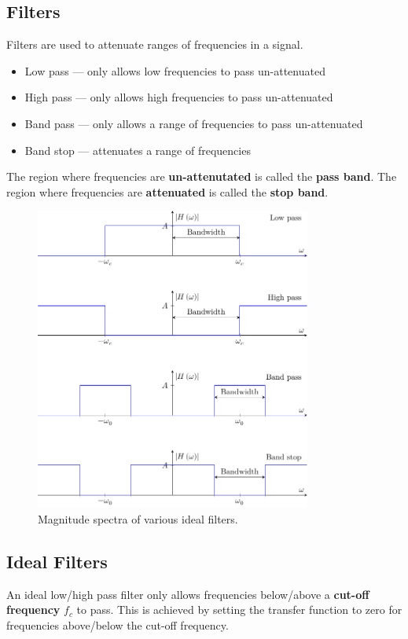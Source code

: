 \documentclass{article}
\begin{document}
\subsection{Filters}
Filters are used to attenuate ranges of frequencies in a signal.
\begin{itemize}
    \item Low pass --- only allows low frequencies to pass un-attenuated
    \item High pass --- only allows high frequencies to pass un-attenuated
    \item Band pass --- only allows a range of frequencies to pass un-attenuated
    \item Band stop --- attenuates a range of frequencies
\end{itemize}
The region where frequencies are \textbf{un-attenutated} is called the \textbf{pass band}.
The region where frequencies are \textbf{attenuated} is called the \textbf{stop band}.
\begin{figure}[H]
    \centering
    \includegraphics[height = 10cm]{figures/filters.pdf}
    \caption{Magnitude spectra of various ideal filters.} %
\end{figure}
\subsection{Ideal Filters}
An ideal low/high pass filter only allows frequencies below/above a \textbf{cut-off frequency} \(f_c\) to pass.
This is achieved by setting the transfer function to zero for frequencies above/below the cut-off frequency.
\end{document}
